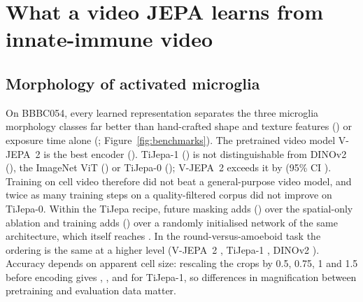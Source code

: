 \section{What a video JEPA learns from innate-immune video}
\label{sec:partA}

\subsection{Morphology of activated microglia}
On BBBC054, every learned representation separates the three microglia morphology classes
far better than hand-crafted shape and texture features ()
or exposure time alone (; Figure~\ref{fig:benchmarks}). The pretrained
video model V-JEPA~2 is the best encoder (). TiJepa-1
() is not distinguishable from DINOv2 (),
the ImageNet ViT () or TiJepa-0 ();
V-JEPA~2 exceeds it by  (95\% CI
). Training on cell video therefore did not beat a
general-purpose video model, and twice as many training steps on a quality-filtered corpus
did not improve on TiJepa-0. Within the TiJepa recipe, future masking adds
() over the spatial-only ablation and training
adds  ()
over a randomly initialised network of the same architecture, which itself reaches
. In the round-versus-amoeboid task the ordering is the same at a
higher level (V-JEPA~2 , TiJepa-1 , DINOv2
). Accuracy depends on apparent cell size: rescaling the crops
by 0.5, 0.75, 1 and 1.5 before encoding gives , ,
 and  for TiJepa-1, so differences in magnification
between pretraining and evaluation data matter.

